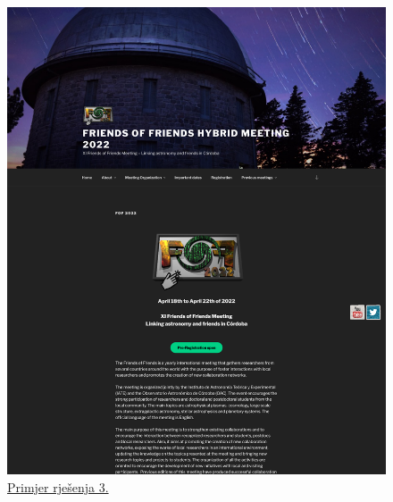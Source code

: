 		\begin{figure}[H]
			\begin{minipage}[t]{0.4\textwidth}
				\includegraphics[width=\linewidth]{slike/frontpage_example3}
				\caption{\href{http://fof.oac.uncor.edu/2022/}{Primjer rješenja 3.}} \label{fig:frontpage_example3}
			\end{minipage}
			\hspace*{\fill}
			\begin{minipage}[t]{0.4\textwidth}

\end{minipage}
\end{figure}
